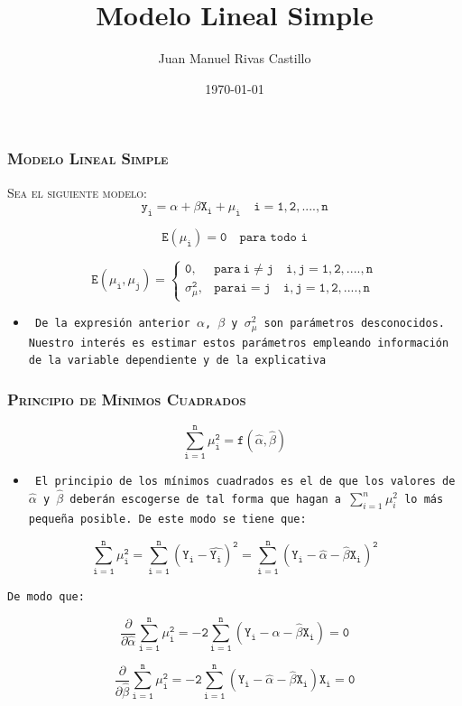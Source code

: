 \documentclass[16.5pt]{beamer}
\title{Modelo Lineal Simple}
\author{Juan Manuel Rivas Castillo}
\institute{UNMSM}
\date{\today}
\begin{document}
\maketitle 

{
\begin{frame}
\frametitle{\textsc{Modelo Lineal Simple}}
\hspace*{-5mm}
\vspace*{-5mm} 
\textsc{Sea el siguiente modelo:} \\
\vspace{0.3cm}
$$\mathtt{y_i= \alpha + \beta X_i + \mu_i  \quad     i = 1,2,....,n}$$

$$\mathtt{E(\mu_i)=0 \quad \textrm{para todo i} }$$

 $$
\mathtt{E(\mu_i,\mu_j)=
    \begin{cases}
      0, & \text{para}\ i\neq j \quad i,j=1,2,....,n \\
      \sigma^2_{\mu}, & \text{para} i = j  \quad i,j=1,2,....,n
    \end{cases}
}
$$

\vspace{0.3cm}
\begin{itemize}
\item \texttt{ De la expresión anterior $\alpha$, $\beta$ y $ \sigma^2_{\mu}$ son parámetros desconocidos. Nuestro interés es estimar estos parámetros empleando información de la {\color{blue}variable dependiente y de la explicativa}}
\end{itemize}
\end{frame}
}

{
\begin{frame}
\frametitle{\textsc{Principio de Mínimos Cuadrados}}
\hspace*{-5mm}
\vspace*{-5mm} 

$$\mathtt{\sum_{i=1}^n \mu^2_i =f(\hat{\alpha},\hat{\beta})}$$
\begin{itemize}
\item \texttt{ El principio de los mínimos cuadrados es el de que los valores de $\hat{\alpha}$ y $\hat{\beta}$ deberán escogerse de tal forma que hagan a $\sum_{i=1}^n \mu^2_i $ lo más pequeña posible. De este modo se tiene que:}
\end{itemize}
$$\mathtt{\sum_{i=1}^n \mu^2_i = \sum_{i=1}^n(Y_i -\hat{Y_i})^2 = \sum_{i=1}^n (Y_i - \hat{\alpha} -\hat{ \beta} X_i)^2}$$

\texttt{De modo que:}

$$\mathtt{\frac{\partial }{\partial \hat{\alpha }}\sum_{i=1}^n \mu^2_i  = -2 \sum_{i=1}^n (Y_i - \hat{\alpha} -\hat{ \beta} X_i)=0}$$

$$\mathtt{\frac{\partial }{\partial \hat{\beta }}\sum_{i=1}^n \mu^2_i  = -2 \sum_{i=1}^n (Y_i - \hat{\alpha} -\hat{ \beta} X_i)X_i=0}$$

\end{frame}
}
\end{document}
